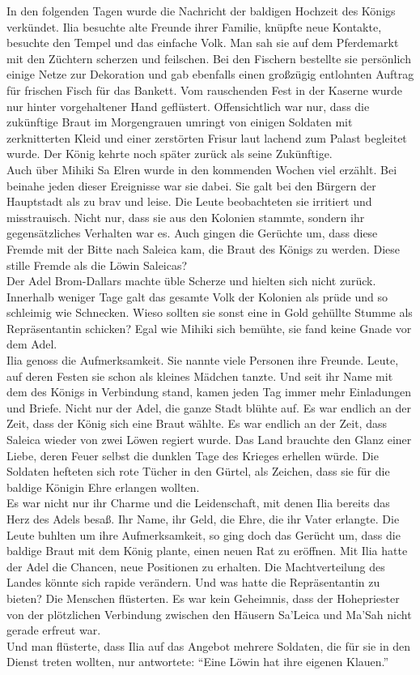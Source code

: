 In den folgenden Tagen wurde die Nachricht der baldigen Hochzeit des Königs verkündet. Ilia 
besuchte alte Freunde ihrer Familie, knüpfte neue Kontakte, besuchte den Tempel und das einfache 
Volk. Man sah sie auf dem Pferdemarkt mit den Züchtern scherzen und feilschen. Bei den Fischern 
bestellte sie persönlich einige Netze zur Dekoration und gab ebenfalls einen großzügig entlohnten 
Auftrag für frischen Fisch für das Bankett. Vom rauschenden Fest in der Kaserne wurde nur hinter 
vorgehaltener Hand geflüstert. Offensichtlich war nur, dass die zukünftige Braut im Morgengrauen 
umringt von einigen Soldaten mit zerknitterten Kleid und einer zerstörten Frisur laut lachend zum 
Palast begleitet wurde. Der König kehrte noch später zurück als seine Zukünftige.\\
Auch über Mihiki Sa Elren wurde in den kommenden Wochen viel erzählt. Bei beinahe jeden dieser 
Ereignisse war sie dabei. Sie galt bei den Bürgern der Hauptstadt als zu brav und leise. Die Leute 
beobachteten sie irritiert und misstrauisch. Nicht nur, dass sie aus den Kolonien stammte, sondern 
ihr gegensätzliches Verhalten war es. Auch gingen die Gerüchte um, dass diese Fremde mit der Bitte 
nach Saleica kam, die Braut des Königs zu werden. Diese stille Fremde als die Löwin Saleicas?\\
Der Adel Brom-Dallars machte üble Scherze und hielten sich nicht zurück. Innerhalb weniger Tage 
galt das gesamte Volk der Kolonien als prüde und so schleimig wie Schnecken. Wieso sollten sie 
sonst eine in Gold gehüllte Stumme als Repräsentantin schicken? Egal wie Mihiki sich bemühte, sie 
fand keine Gnade vor dem Adel.\\
Ilia genoss die Aufmerksamkeit. Sie nannte viele Personen ihre Freunde. Leute, auf deren Festen sie 
schon als kleines Mädchen tanzte. Und seit ihr Name mit dem des Königs in Verbindung stand, kamen 
jeden Tag immer mehr Einladungen und Briefe. Nicht nur der Adel, die ganze Stadt blühte auf. Es war 
endlich an der Zeit, dass der König sich eine Braut wählte. Es war endlich an der Zeit, dass 
Saleica wieder von zwei Löwen regiert wurde. Das Land brauchte den Glanz einer Liebe, deren Feuer 
selbst die dunklen Tage des Krieges erhellen würde. Die Soldaten hefteten sich rote Tücher in den 
Gürtel, als Zeichen, dass sie für die baldige Königin Ehre erlangen wollten.\\
Es war nicht nur ihr Charme und die Leidenschaft, mit denen Ilia bereits das Herz des Adels besaß. 
Ihr Name, ihr Geld, die Ehre, die ihr Vater erlangte. Die Leute buhlten um ihre Aufmerksamkeit, so 
ging doch das Gerücht um, dass die baldige Braut mit dem König plante, einen neuen Rat zu eröffnen. 
Mit Ilia hatte der Adel die Chancen, neue Positionen zu erhalten. Die Machtverteilung des Landes 
könnte sich rapide verändern. Und was hatte die Repräsentantin zu bieten? Die Menschen flüsterten. 
Es war kein Geheimnis, dass der Hohepriester von der plötzlichen Verbindung zwischen den Häusern 
Sa'Leica und Ma'Sah nicht gerade erfreut war.\\
Und man flüsterte, dass Ilia auf das Angebot mehrere Soldaten, die für sie in den Dienst 
treten wollten, nur antwortete: ``Eine Löwin hat ihre eigenen Klauen.''
